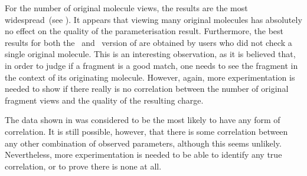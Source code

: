 For the number of original molecule views, the results are the most widespread~(see ). It appears that viewing many original molecules has absolutely no effect on the quality of the parameterisation result. Furthermore, the best results for both the \IDa\ and \IDb\ version of \oframp{} are obtained by users who did not check a single original molecule. This is an interesting observation, as it is believed that, in order to judge if a fragment is a good match, one needs to see the fragment in the context of its originating molecule. However, again, more experimentation is needed to show if there really is no correlation between the number of original fragment views and the quality of the resulting charge.

The data shown in  was considered to be the most likely to have any form of correlation. It is still possible, however, that there is some correlation between any other combination of observed parameters, although this seems unlikely. Nevertheless, more experimentation is needed to be able to identify any true correlation, or to prove there is none at all.
